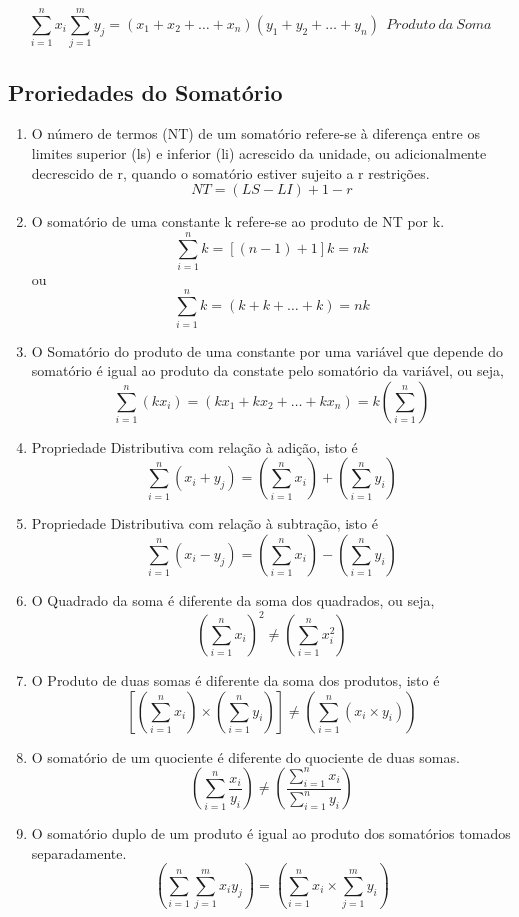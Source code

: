 $$ \sum_{i=1}^{n}x_{i} \sum_{j=1}^{m}y_{j}= (x_{1}+x_{2}+\ldots+x_{n})(y_{1}+y_{2}+\ldots+y_{n}) \ \ Produto \ da \ Soma$$


\subsection{Proriedades do Somatório}

\begin{enumerate}
  \item [{a})] O número de termos (NT) de um somatório refere-se à diferença entre os limites superior (ls) e inferior (li) acrescido da unidade, ou adicionalmente decrescido de r, quando o somatório estiver sujeito a r restrições.
\begin{equation}\label{}
    NT=(LS-LI)+1-r
\end{equation}
  \item [{b})] O somatório de uma constante k refere-se ao produto de NT por k.
$$\sum_{i=1}^{n}k=[(n-1)+1]k = nk $$
ou
$$ \sum_{i=1}^{n}k = (k+k+\ldots+k) = nk $$
  \item [{c})] O Somatório do produto de uma constante por uma variável que depende do somatório é igual ao produto da constate pelo somatório da variável, ou seja,
$$ \sum_{i=1}^{n}(kx_{i}) = (kx_{1}+kx_{2}+\ldots+kx_{n}) = k \left( \sum_{i=1}^{n} \right)$$
      \item [{d})] Propriedade Distributiva com relação à adição, isto é
$$ \sum_{i=1}^{n}(x_{i}+y_{j}) = \left( \sum_{i=1}^{n}x_{i} \right) + \left( \sum_{i=1}^{n}y_{i} \right) $$
  \item [{e})] Propriedade Distributiva com relação à subtração, isto é
$$ \sum_{i=1}^{n}(x_{i}-y_{j}) = \left( \sum_{i=1}^{n}x_{i}\right) - \left( \sum_{i=1}^{n}y_{i}  \right) $$
  \item [{f})] O Quadrado da soma é diferente da soma dos quadrados, ou seja,
  $$\left(\sum_{i=1}^{n}x_{i}\right)^{2} \neq  \left( \sum_{i=1}^{n}x_{i}^{2} \right)$$
  \item [{g})] O Produto de duas somas é diferente da soma dos produtos, isto é
  $$ \left[ \left(\sum_{i=1}^{n}x_{i} \right) \times \left(\sum_{i=1}^{n}y_{i} \right) \right] \neq  \left( \sum_{i=1}^{n} (x_{i} \times y_{i})\right) $$
  \item [{h})] O somatório de um quociente é diferente do quociente de duas somas.
$$  \left( \sum_{i=1}^{n} \frac{x_{i}}{y_{i}} \right) \neq \left( \frac{\sum_{i=1}^{n}x_{i}}{\sum_{i=1}^{n}y_{i}} \right) $$
  \item [{i})] O somatório duplo de um produto é igual ao produto dos somatórios tomados separadamente.
  $$   \left( \sum_{i=1}^{n} \sum_{j=1}^{m}x_{i}y_{j} \right)  =  \left( \sum_{i=1}^{n}x_{i} \times \sum_{j=1}^{m}y_{i} \right) $$
\end{enumerate}

